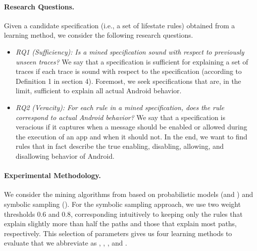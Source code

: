 \documentclass[10pt,reprint,nocopyrightspace,numbers]{sigplanconf}
\begin{document}
\paragraph{Research Questions.}
Given a candidate specification (i.e., a set of lifestate rules) obtained from a learning method, we consider the following research questions.
\begin{itemize}\itemsep 0pt
\item
{}
\emph{RQ1 (Sufficiency): Is a mined specification sound with respect to previously unseen traces?} We say that a specification is sufficient for explaining a set of traces if each trace is sound with respect to the specification (according to Definition 1 in section 4). Foremost, we seek specifications that are, in the limit, sufficient to explain all actual Android behavior.
\item
{}
\emph{RQ2 (Veracity): For each rule in a mined specification, does the rule correspond to actual Android behavior?} We say that a specification is veracious if it captures when a message should be enabled or allowed during the execution of an app and when it should not. 
In the end, we want to find rules that in fact describe the true enabling, disabling, allowing, and disallowing behavior of Android.
%

\end{itemize}

\paragraph{Experimental Methodology.}

We consider the mining algorithms from  based on probabilistic models (\hmm and \pfsa) and symbolic sampling (\sharpsat).
For the symbolic sampling approach, we use two weight thresholds 0.6 and 0.8, corresponding intuitively to keeping only the rules that explain slightly more than half the paths and those that explain most paths, respectively.
This selection of parameters gives us four learning methods to evaluate that we abbreviate as , , \hmm, and \pfsa.
\end{document}
